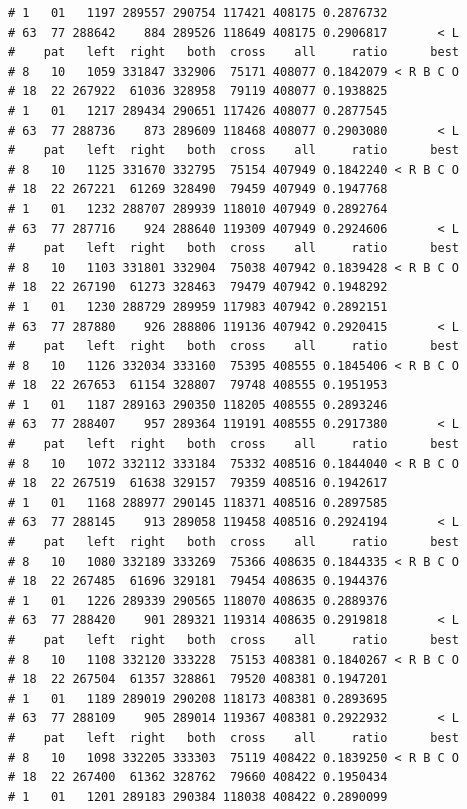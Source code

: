 \documentclass{article}\usepackage[]{graphicx}\usepackage[]{color}
\makeatletter
\newenvironment{kframe}{%
 \def\at@end@of@kframe{}%
 \ifinner\ifhmode%
  \def\at@end@of@kframe{\end{minipage}}%
  \begin{minipage}{\columnwidth}%
 \fi\fi%
 \def\FrameCommand##1{\hskip\@totalleftmargin \hskip-\fboxsep
 \colorbox{shadecolor}{##1}\hskip-\fboxsep
     \hskip-\linewidth \hskip-\@totalleftmargin \hskip\columnwidth}%
 \MakeFramed {\advance\hsize-\width
   \@totalleftmargin\z@ \linewidth\hsize
   \@setminipage}}%
 {\par\unskip\endMakeFramed%
 \at@end@of@kframe}
\newenvironment{knitrout}{}{} %
\makeatother
\begin{document}
\begin{knitrout}
\begin{kframe}
\begin{verbatim}
# 1   01   1197 289557 290754 117421 408175 0.2876732          
# 63  77 288642    884 289526 118649 408175 0.2906817       < L
#    pat   left  right   both  cross    all     ratio      best
# 8   10   1059 331847 332906  75171 408077 0.1842079 < R B C O
# 18  22 267922  61036 328958  79119 408077 0.1938825          
# 1   01   1217 289434 290651 117426 408077 0.2877545          
# 63  77 288736    873 289609 118468 408077 0.2903080       < L
#    pat   left  right   both  cross    all     ratio      best
# 8   10   1125 331670 332795  75154 407949 0.1842240 < R B C O
# 18  22 267221  61269 328490  79459 407949 0.1947768          
# 1   01   1232 288707 289939 118010 407949 0.2892764          
# 63  77 287716    924 288640 119309 407949 0.2924606       < L
#    pat   left  right   both  cross    all     ratio      best
# 8   10   1103 331801 332904  75038 407942 0.1839428 < R B C O
# 18  22 267190  61273 328463  79479 407942 0.1948292          
# 1   01   1230 288729 289959 117983 407942 0.2892151          
# 63  77 287880    926 288806 119136 407942 0.2920415       < L
#    pat   left  right   both  cross    all     ratio      best
# 8   10   1126 332034 333160  75395 408555 0.1845406 < R B C O
# 18  22 267653  61154 328807  79748 408555 0.1951953          
# 1   01   1187 289163 290350 118205 408555 0.2893246          
# 63  77 288407    957 289364 119191 408555 0.2917380       < L
#    pat   left  right   both  cross    all     ratio      best
# 8   10   1072 332112 333184  75332 408516 0.1844040 < R B C O
# 18  22 267519  61638 329157  79359 408516 0.1942617          
# 1   01   1168 288977 290145 118371 408516 0.2897585          
# 63  77 288145    913 289058 119458 408516 0.2924194       < L
#    pat   left  right   both  cross    all     ratio      best
# 8   10   1080 332189 333269  75366 408635 0.1844335 < R B C O
# 18  22 267485  61696 329181  79454 408635 0.1944376          
# 1   01   1226 289339 290565 118070 408635 0.2889376          
# 63  77 288420    901 289321 119314 408635 0.2919818       < L
#    pat   left  right   both  cross    all     ratio      best
# 8   10   1108 332120 333228  75153 408381 0.1840267 < R B C O
# 18  22 267504  61357 328861  79520 408381 0.1947201          
# 1   01   1189 289019 290208 118173 408381 0.2893695          
# 63  77 288109    905 289014 119367 408381 0.2922932       < L
#    pat   left  right   both  cross    all     ratio      best
# 8   10   1098 332205 333303  75119 408422 0.1839250 < R B C O
# 18  22 267400  61362 328762  79660 408422 0.1950434          
# 1   01   1201 289183 290384 118038 408422 0.2890099          

\end{verbatim}
\end{kframe}
\end{knitrout}
\end{document}

